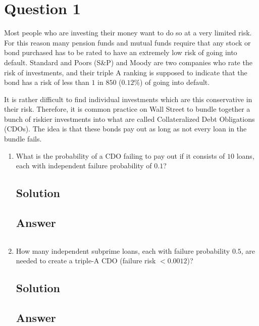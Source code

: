 \documentclass[12pt]{article}
\begin{document}
	
	\section*{Question 1}
	
	\noindent Most people who are investing their money want to do so at a very limited risk. For this reason many pension funds and mutual funds require that any stock or bond purchased has to be rated to have an extremely low risk of going into default. Standard and Poors (S\&P) and Moody are two companies who rate the risk of investments, and their triple A ranking is supposed to indicate that the bond has a risk of less than $1$ in $850$ ($0.12\%$) of going into default.
	
	\bigskip
	
	\noindent It is rather difficult to find individual investments which are this conservative in their risk. Therefore, it is common practice on Wall Street to bundle together a bunch of riskier investments into what are called Collateralized Debt Obligations (CDOs). The idea is that these bonds pay out as long as not every loan in the bundle fails.
	
	\bigskip
	
	\begin{enumerate}[start=1,label={\bfseries Part \arabic*:},leftmargin=0in]
		\bigskip\item What is the probability of a CDO failing to pay out if it consists of $10$ loans, each with independent failure probability of $0.1$?
		
		\subsection*{Solution}
		
		\subsection*{Answer}
		
			\[\boxed{}\]
		
		\bigskip\item How many independent subprime loans, each with failure probability $0.5$, are needed to create a triple-A CDO (failure risk $< 0.0012$)?
		
		\subsection*{Solution}
		
		\subsection*{Answer}
		
			\[\boxed{}\]
	\end{enumerate}
	
\end{document}
